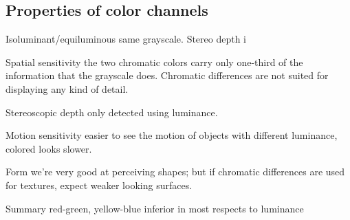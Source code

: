 \begin{mdframed}\begin{multicols}{2}
\subsection{Properties of color channels}
\begin{compactdesc}
    \item[Isoluminant/equiluminous] same grayscale. Stereo depth i
    \item[Spatial sensitivity] the two chromatic colors carry only one-third
         of the information that the grayscale does. Chromatic differences are
         not suited for displaying any kind of detail.
    \item[Stereoscopic depth] only detected using luminance.
    \item[Motion sensitivity] easier to see the motion of objects with
        different luminance, colored looks slower.
    \item[Form] we're very good at perceiving shapes; but if chromatic
        differences are used for textures, expect weaker looking surfaces.
    \item[Summary] red-green, yellow-blue inferior in most respects to
        luminance
\end{compactdesc}
\end{multicols}\end{mdframed}


